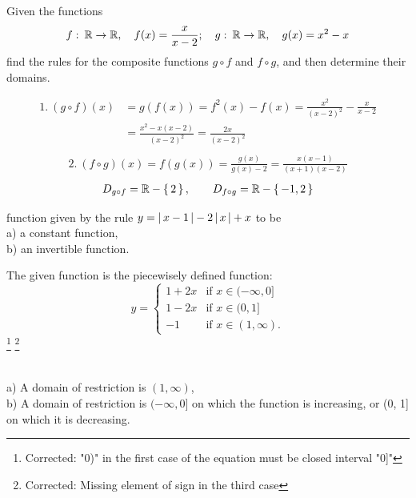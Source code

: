 \documentclass[11pt]{amsbook}
\begin{document}
\begin{exmp}
	Given the functions
	\begin{align*}
		 f \, \colon \, \mathbb{R} \to \mathbb{R} , \quad f(x) = \frac{x}{x-2}; \quad  g \, \colon \, \mathbb{R} \to \mathbb{R} , \quad g(x) = x^{2}-x
	\end{align*}
	find the rules for the composite functions $g \circ f$ and $f \circ g$, and then determine their domains.
	\begin{hSolution}
		\begin{align*}
			1.\: (g \circ f)(x) &= g(f(x)) = f^{2}(x)-f(x) = \frac{x^{2}}{(x-2)^{2}} - \frac{x}{x-2} \\
			&= \frac{x^{2}-x(x-2)}{(x-2)^{2}} = \frac{2x}{(x-2)^{2}} \\
		\end{align*}
		\begin{align*}
			2.\: (f \circ g)(x) = f(g(x)) = \frac{g(x)}{g(x)-2} = \frac{x(x-1)}{(x+1)(x-2)}
		\end{align*}
		\begin{align*}
			D_{g \circ f} = \mathbb{R} -  \left \{ \, 2 \, \right \} , \qquad D_{f \circ g} = \mathbb{R} -  \left \{ \, -1, 2 \, \right \} 
		\end{align*}
	\end{hSolution}
\end{exmp}


function given by the rule $ y = \left \lvert \, x-1 \, \right \rvert - 2\left \lvert \, x \, \right \rvert+ x $ to be \\
a) a constant function, \\
b) an invertible function.

\begin{hSolution}
	The given function is the piecewisely defined function:
	\[
		y = 
		\begin{cases}
			1+2x & \text{if }x \in(-\infty, 0] \\
			1-2x & \text{if }x \in(0, 1] \\
			-1 & \text{if }x \in(1, \infty).
		\end{cases}
	\]
\footnote{Corrected: "0)" in the first case of the equation must be closed interval "0]"}
\footnote{Corrected: Missing element of sign in the third case}
\end{hSolution}\\
a) A domain of restriction is $(1, \infty)$, \\
b) A domain of restriction is $(-\infty, 0]$ on which the function is increasing, or (0, 1] on which it is decreasing.
\end{document}
